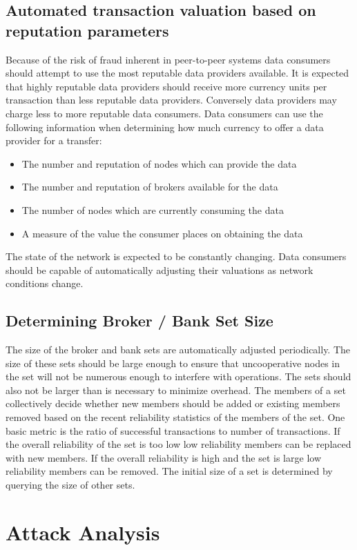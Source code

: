 \documentclass[%
				10pt,
        final,
        notitlepage,
        narroweqnarray,
        inline,
        twoside,
        ]{ieee}
\begin{document}
\subsection{Automated transaction valuation based on reputation parameters}
Because of the risk of fraud inherent in peer-to-peer systems data consumers should attempt to use the most reputable data providers available.  It is expected that highly reputable data providers should receive more currency units per transaction than less reputable data providers.  Conversely data providers may charge less to more reputable data consumers.  
Data consumers can use the following information when determining how much currency to offer a data provider for a transfer:
\begin{itemize}
\item The number and reputation of nodes which can provide the data
\item The number and reputation of brokers available for the data
\item The number of nodes which are currently consuming the data
\item A measure of the value the consumer places on obtaining the data
\end{itemize}
The state of the network is expected to be constantly changing.  Data consumers should be capable of automatically adjusting their valuations as network conditions change. 

\subsection{Determining Broker / Bank Set Size}
The size of the broker and bank sets are automatically adjusted periodically.  The size of these sets should be large enough to ensure that uncooperative nodes in the set will not be numerous enough to interfere with operations.  The sets should also not be larger than is necessary to minimize overhead.  The members of a set collectively decide whether new members should be added or existing members removed based on the recent reliability statistics of the members of the set.  One basic metric is the ratio of successful transactions to number of transactions.  If the overall reliability of the set is too low low reliability members can be replaced with new members.  If the overall reliability is high and the set is large low reliability members can be removed.  The initial size of a set is determined by querying the size of other sets.

\section{Attack Analysis}
\end{document}
